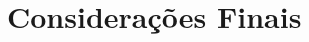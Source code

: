 \documentclass[11pt,oneside,a4paper,english,french,spanish,brazil]{abntex2}
\begin{document}
            \chapter{Considerações Finais}\label{cap:conclusao}
            

          \pagestyle{inovapre}
        
            \clearpage
            
        



                

                

          
            \printindex

\end{document}
